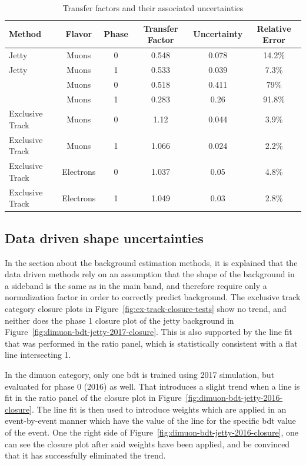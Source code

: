 \begin{table}[hp]
	\centering
	\label{tab:transfer-factors}
		\caption{Transfer factors and their associated uncertainties}
			\begin{tabular}{lccccc} \hline
			Method & Flavor & Phase & Transfer Factor & Uncertainty & Relative Error \\ \hline
			Jetty & Muons & 0 &  0.548 & 0.078 & 14.2\% \\
			Jetty & Muons & 1 &  0.533 & 0.039 & 7.3\% \\
			\tautau & Muons & 0 &  0.518 & 0.411 & 79\% \\
			\tautau & Muons & 1 &  0.283 & 0.26 & 91.8\% \\
			Exclusive Track & Muons & 0 & 1.12 & 0.044 & 3.9\% \\ 
			Exclusive Track & Muons & 1 & 1.066 & 0.024 & 2.2\% \\	
			Exclusive Track & Electrons & 0 & 1.037 & 0.05 & 4.8\% \\	
			Exclusive Track & Electrons & 1 & 1.049 & 0.03 & 2.8\% \\			
			
			\hline
			\end{tabular}
\end{table}

\subsection{Data driven shape uncertainties}
\label{sec:data-driven-shape}

In the section about the background estimation methods, it is explained that the data driven methods rely on an assumption that the shape of the background in a sideband is the same as in the main band, and therefore require only a normalization factor in order to correctly predict background. The exclusive track category closure plots in Figure~\ref{fig:ex-track-closure-tests} show no trend, and neither does the phase 1 closure plot of the jetty background in Figure~\ref{fig:dimuon-bdt-jetty-2017-closure}. This is also supported by the line fit that was performed in the ratio panel, which is statistically consistent with a flat line intersecting 1. 

In the dimuon category, only one \gls{bdt} is trained using 2017 simulation, but evaluated for phase 0 (2016) as well. That introduces a slight trend when a line is fit in the ratio panel of the closure plot in Figure~\ref{fig:dimuon-bdt-jetty-2016-closure}. The line fit is then used to introduce weights which are applied in an event-by-event manner which have the value of the line for the specific \gls{bdt} value of the event. One the right side of Figure~\ref{fig:dimuon-bdt-jetty-2016-closure}, one can see the closure plot after said weights have been applied, and be convinced that it has successfully eliminated the trend.


